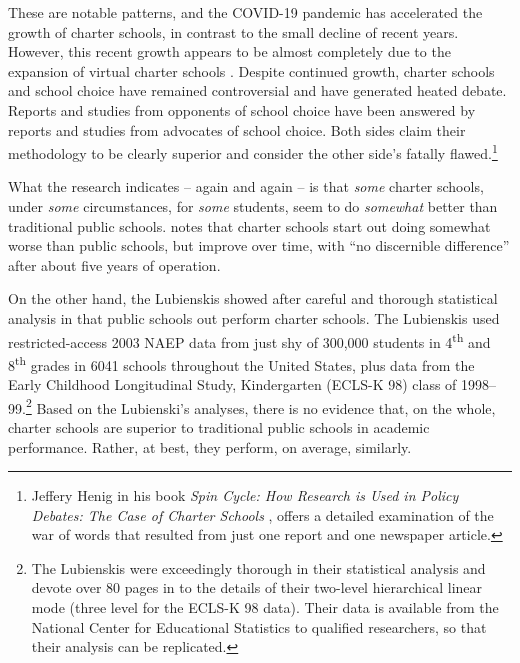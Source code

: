 These are notable patterns, and the COVID-19 pandemic has accelerated the growth of charter schools, in contrast to the small decline of recent years. However, this recent growth appears to be almost completely due to the expansion of virtual charter schools \parencite{Strauss2021}. Despite continued growth, charter schools and school choice have remained controversial and have generated heated debate. Reports and studies from opponents of school choice have been answered by reports and studies from advocates of school choice. Both sides claim their methodology to be clearly superior and consider the other side's fatally flawed.\footnote{Jeffery Henig in his book \textit{Spin Cycle: How Research is Used in Policy Debates: The Case of Charter Schools} \parencite{Henig2009}, offers a detailed examination of the war of words that resulted from just one report and one newspaper article.}

What the research indicates – again and again – is that \textit{some} charter schools, under \textit{some} circumstances, for \textit{some} students, seem to do \textit{somewhat} better than traditional public schools. \citeauthor{Garcia2018} notes that charter schools start out doing somewhat worse than public schools, but improve over time, with ``no discernible difference'' \parencite[119]{Garcia2018} after about five years of operation.

On the other hand, the Lubienskis showed after careful and thorough statistical analysis in \textcite{Lubienski.Lubienski2014} that public schools out perform charter schools. The Lubienskis used restricted-access 2003 NAEP data from just shy of 300,000 students in 4\textsuperscript{th} and 8\textsuperscript{th} grades in 6041 schools throughout the United States, plus data from the Early Childhood Longitudinal Study, Kindergarten (ECLS-K 98) class of 1998–99.\footnote{The Lubienskis were exceedingly thorough in their statistical analysis and devote over 80 pages in \textcite{Lubienski.Lubienski2014} to the details of their two-level hierarchical linear mode (three level for the ECLS-K 98 data). Their data is available from the National Center for Educational Statistics to qualified researchers, so that their analysis can be replicated.} Based on the Lubienski’s analyses, there is no evidence that, on the whole, charter schools are superior to traditional public schools in academic performance. Rather, at best, they perform, on average, similarly.

